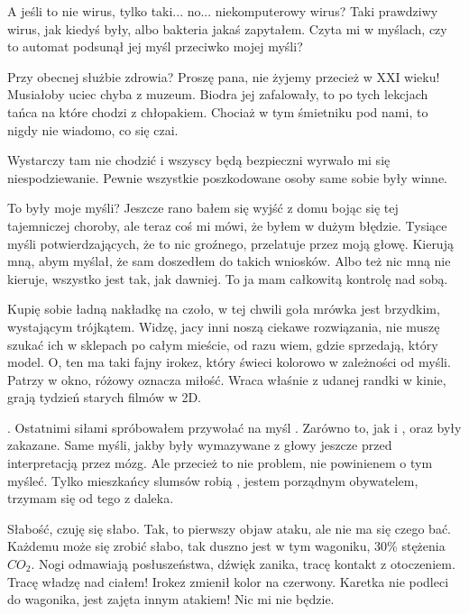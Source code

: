 \ds{} A jeśli to nie wirus, tylko taki... no... niekomputerowy wirus? Taki prawdziwy wirus, jak kiedyś były, albo bakteria jakaś \dm{}
zapytałem. Czyta mi w myślach, czy to automat podsunął jej myśl przeciwko mojej myśli?\de{}

\ds{} Przy obecnej służbie zdrowia? Proszę pana, nie żyjemy przecież w XXI wieku! Musiałoby uciec chyba z muzeum.
\dm{} Biodra jej zafalowały, to po tych lekcjach tańca na które chodzi z chłopakiem. \dm{} Chociaż w tym śmietniku pod nami, to nigdy nie wiadomo, co się czai. \de{}

\ds{} Wystarczy tam nie chodzić i wszyscy będą bezpieczni \dm{} wyrwało mi się niespodziewanie. \dm{} Pewnie wszystkie poszkodowane osoby same sobie były winne. \de{}

To były moje myśli? Jeszcze rano bałem się wyjść z domu bojąc się tej tajemniczej choroby, ale teraz coś mi mówi, że byłem w dużym błędzie.
Tysiące myśli potwierdzających, że to nic groźnego, przelatuje przez moją głowę.
Kierują mną, abym myślał, że sam doszedłem do takich wniosków.
Albo też nic mną nie kieruje, wszystko jest tak, jak dawniej. To ja mam całkowitą kontrolę nad sobą.

Kupię sobie ładną nakładkę na czoło, w tej chwili goła mrówka jest brzydkim, wystającym trójkątem.
Widzę, jacy inni noszą ciekawe rozwiązania, nie muszę szukać ich w sklepach po całym mieście, od razu wiem, gdzie sprzedają, który model.
O, ten ma taki fajny irokez, który świeci kolorowo w zależności od myśli. Patrzy w okno, różowy oznacza miłość.
Wraca właśnie z udanej randki w kinie, grają tydzień starych filmów w 2D.

\censor{}. Ostatnimi siłami spróbowałem przywołać na myśl \censor{}. 
Zarówno to, jak i \censor{}, oraz \censor{} były zakazane.
Same myśli, jakby były wymazywane z głowy jeszcze przed interpretacją przez mózg.
Ale przecież to nie problem, nie powinienem o tym myśleć. 
Tylko mieszkańcy slumsów robią \censor{}, jestem porządnym obywatelem, trzymam się od tego z daleka.

Słabość, czuję się słabo.
Tak, to pierwszy objaw ataku, ale nie ma się czego bać.
Każdemu może się zrobić słabo, tak duszno jest w tym wagoniku, 30\% stężenia $CO_2$.
Nogi odmawiają posłuszeństwa, dźwięk zanika, tracę kontakt z otoczeniem.
Tracę władzę nad ciałem! Irokez zmienił kolor na czerwony.
Karetka nie podleci do wagonika, jest zajęta innym atakiem!
Nic mi nie będzie.


